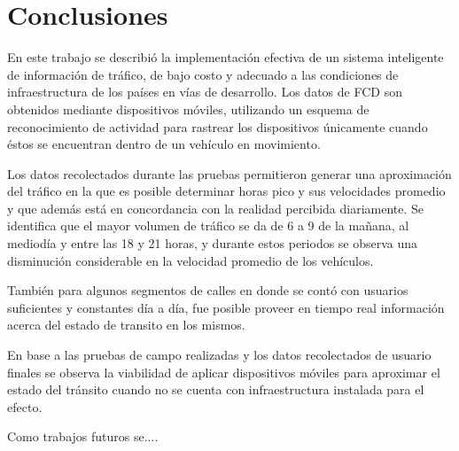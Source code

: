 \section{Conclusiones}
\label{sec:conclusiones}

En este trabajo se describió la implementación efectiva de un sistema inteligente de información de tráfico, de bajo costo y adecuado a las condiciones de infraestructura de los países en vías de desarrollo. Los datos de FCD son obtenidos mediante dispositivos móviles, utilizando un esquema de reconocimiento de actividad para rastrear los dispositivos únicamente cuando éstos se encuentran dentro de un vehículo en movimiento.

Los datos recolectados durante las pruebas permitieron generar una aproximación del tráfico en la que es posible determinar horas pico y sus velocidades promedio y que además está en concordancia con la realidad percibida diariamente. Se identifica que el mayor volumen de tráfico se da de 6 a 9 de la mañana, al mediodía y entre las 18 y 21 horas, y durante estos periodos se observa una disminución considerable en la velocidad promedio de los vehículos.

También para algunos segmentos de calles en donde se contó con usuarios suficientes y constantes día a día, fue posible proveer en tiempo real información acerca del estado de transito en los mismos.

En base a las pruebas de campo realizadas y los datos recolectados de usuario finales se observa la viabilidad de aplicar dispositivos móviles para aproximar el estado del tránsito cuando no se cuenta con infraestructura instalada para el efecto.

Como trabajos futuros se....